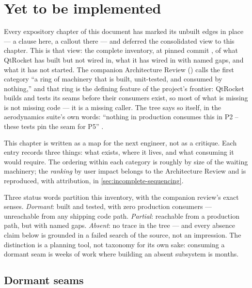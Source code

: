 \section{Yet to be implemented}\label{sec:incomplete}

Every expository chapter of this document has marked its unbuilt edges in place --- a clause
here, a callout there --- and deferred the consolidated view to this chapter. This is that
view: the complete inventory, at pinned commit , of what QtRocket has built
but not wired in, what it has wired in with named gaps, and what it has not started. The
companion Architecture Review () calls the first
category ``a ring of machinery that is built, unit-tested, and consumed by nothing,'' and
that ring is the defining feature of the project's frontier: QtRocket builds and tests its
seams before their consumers exist, so most of what is missing is not missing code --- it is
a missing caller. The tree says so itself, in the aerodynamics suite's own words:
``nothing in production consumes this in P2 -- these tests pin the seam for P5''
.

This chapter is written as a map for the next engineer, not as a critique. Each entry
records three things: what exists, where it lives, and what consuming it would require.
The ordering within each category is roughly by size of the waiting machinery; the
\emph{ranking} by user impact belongs to the Architecture Review and is reproduced, with
attribution, in \cref{sec:incomplete-sequencing}.

\begin{designrule}
Three status words partition this inventory, with the companion review's exact senses.
\emph{Dormant}: built and tested, with zero production consumers --- unreachable from any
shipping code path. \emph{Partial}: reachable from a production path, but with named gaps.
\emph{Absent}: no trace in the tree --- and every absence claim below is grounded in a
failed search of the source, not an impression. The distinction is a planning tool, not
taxonomy for its own sake: consuming a dormant seam is weeks of work where building an
absent subsystem is months.
\end{designrule}

\subsection{Dormant seams}\label{sec:incomplete-dormant}

